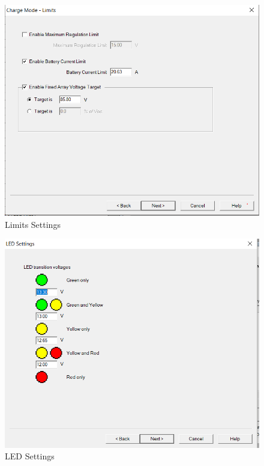 \begin{figure}[!htb]
	\includegraphics[width=\textwidth,height=\textwidth]{./graphics/tsmppt_troubleshooting/ms_9.png}
	\caption{\label{fig:settings-4} Limits Settings}
\end{figure}
\begin{figure}[!htb]
	\includegraphics[width=\textwidth,height=\textwidth]{./graphics/tsmppt_troubleshooting/ms_10.png}
	\caption{\label{fig:settings-5} LED Settings}
\end{figure}
